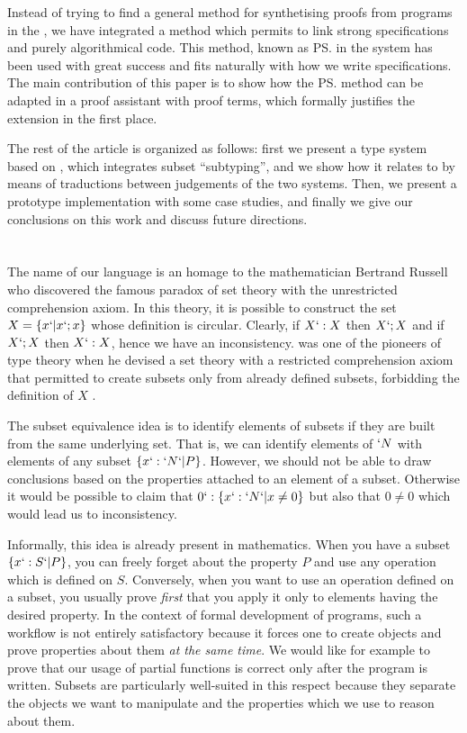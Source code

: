 \documentclass{llncs}
\begin{document}
Instead of trying to find a general method for synthetising proofs from
programs in the \CICfull, we have integrated a method which permits to
link strong specifications and purely algorithmical code. This method,
known as \ps{} in the \PVS{} system has been used with great success and
fits naturally with how we write specifications. The main contribution
of this paper is to show how the \ps{} method can be adapted in a proof
assistant with proof terms, which formally justifies the extension in
the first place.

The rest of the article is organized as follows: first we present a
type system based on \ECC{}, which integrates subset ``subtyping'', and
we show how it relates to \CIC{} by means of traductions between
judgements of the two systems. Then, we present a prototype
implementation with some case studies, and finally we give our
conclusions on this work and discuss future directions.

\section{\Russell{}}
The name of our language is an homage to the mathematician Bertrand Russell who
discovered the famous paradox of set theory with the unrestricted
comprehension axiom. In this theory, it is possible to construct the set
$X = \{x `| x `; x\}$ whose definition is circular. Clearly, if $X `: X$
then $X `; X$ and if $X `; X$ then $X `: X$, hence we have an
inconsistency. \Russell{} was one of the pioneers of type theory when he
devised a set theory with a restricted comprehension axiom that
permitted to create subsets only from already defined subsets,
forbidding the definition of $X$ \cite{whitehead.russell:principia}. 

The subset equivalence idea is to identify elements of subsets if
they are built from the same underlying set. That is, we can identify
elements of $`N$ with elements of any subset $\{ x `: `N `| P \}$.
However, we should not be able to draw conclusions based on the
properties attached to an element of a subset. Otherwise it would be
possible to claim that $0 `: \{ x `: `N `| x \neq 0 \}$ but also that $0
\neq 0$ which would lead us to inconsistency. 

Informally, this idea is already present in mathematics. When you have a
subset $\{ x `: S `| P \}$, you can freely forget about the property $P$
and use any operation which is defined on $S$. Conversely, when you
want to use an operation defined on a subset, you usually prove \emph{first}
that you apply it only to elements having the desired property. 
In the context of formal development of programs, such a workflow is not
entirely satisfactory because it forces one to create objects and prove
properties about them \emph{at the same time}. We would like for example
to prove that our usage of partial functions is correct only after the
program is written. Subsets are particularly well-suited in this respect
because they separate the objects we want to manipulate and the
properties which we use to reason about them.
\end{document}
